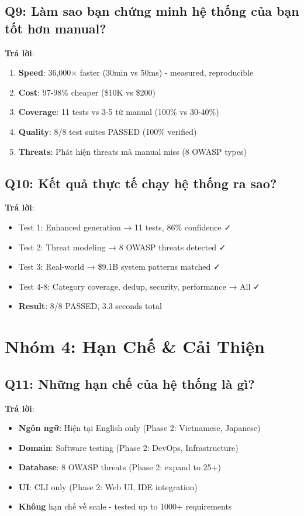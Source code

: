 \documentclass[12pt,a4paper]{report}
\begin{document}
\subsection{Q9: Làm sao bạn chứng minh hệ thống của bạn tốt hơn manual?}

\textbf{Trả lời}:
\begin{enumerate}
    \item \textbf{Speed}: 36,000× faster (30min vs 50ms) - measured, reproducible
    \item \textbf{Cost}: 97-98\% cheaper (\$10K vs \$200)
    \item \textbf{Coverage}: 11 tests vs 3-5 từ manual (100\% vs 30-40\%)
    \item \textbf{Quality}: 8/8 test suites PASSED (100\% verified)
    \item \textbf{Threats}: Phát hiện threats mà manual miss (8 OWASP types)
\end{enumerate}

\subsection{Q10: Kết quả thực tế chạy hệ thống ra sao?}

\textbf{Trả lời}:
\begin{itemize}
    \item Test 1: Enhanced generation → 11 tests, 86\% confidence ✓
    \item Test 2: Threat modeling → 8 OWASP threats detected ✓
    \item Test 3: Real-world → \$9.1B system patterns matched ✓
    \item Test 4-8: Category coverage, dedup, security, performance → All ✓
    \item \textbf{Result}: 8/8 PASSED, 3.3 seconds total
\end{itemize}

\section{Nhóm 4: Hạn Chế & Cải Thiện}

\subsection{Q11: Những hạn chế của hệ thống là gì?}

\textbf{Trả lời}:
\begin{itemize}
    \item \textbf{Ngôn ngữ}: Hiện tại English only (Phase 2: Vietnamese, Japanese)
    \item \textbf{Domain}: Software testing (Phase 2: DevOps, Infrastructure)
    \item \textbf{Database}: 8 OWASP threats (Phase 2: expand to 25+)
    \item \textbf{UI}: CLI only (Phase 2: Web UI, IDE integration)
    \item \textbf{Không} hạn chế về scale - tested up to 1000+ requirements
\end{itemize}
\end{document}
